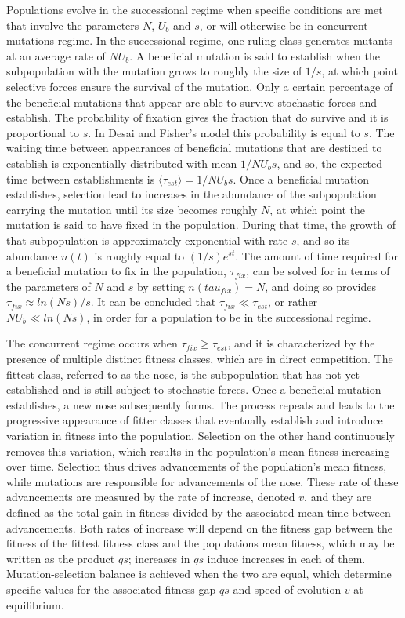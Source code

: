 \documentclass[12pt, one column]{article}
\begin{document}
Populations evolve in the successional regime when specific conditions are met that involve the parameters $N$, $U_b$ and $s$, or will otherwise be in concurrent-mutations regime.  In the successional regime, one ruling class generates mutants at an average rate of $N U_b$.  A beneficial mutation is said to establish when the subpopulation with the mutation grows to roughly the size of $1/s$, at which point selective forces ensure the survival of the mutation.  Only a certain percentage of the beneficial mutations that appear are able to survive stochastic forces and establish.  The probability of fixation gives the fraction that do survive and it is proportional to $s$.  In Desai and Fisher's model this probability is equal to $s$.  The waiting time between appearances of beneficial mutations that are destined to establish is exponentially distributed with mean $1/NU_b s$, and so, the expected time between establishments is $\langle \tau_{est} \rangle = 1/NU_b s$.  Once a beneficial mutation establishes, selection lead to increases in the abundance of the subpopulation carrying the mutation until its size becomes roughly $N$, at which point the mutation is said to have fixed in the population.  During that time, the growth of that subpopulation is approximately exponential with rate $s$, and so its abundance $n(t)$ is roughly equal to $(1/s) e^{st}$.  The amount of time required for a beneficial mutation to fix in the population, $\tau_{fix}$, can be solved for in terms of the parameters of $N$ and $s$ by setting $n(tau_{fix})=N$, and doing so provides $\tau_{fix} \approx ln(Ns)/s$.  It can be concluded that $\tau_{fix} \ll \tau_{est}$, or rather $N U_b \ll ln(Ns)$, in order for a population to be in the successional regime. 

The concurrent regime occurs when $\tau_{fix} \ge \tau_{est}$, and it is characterized by the presence of multiple distinct fitness classes, which are in direct competition.  The fittest class, referred to as the nose, is the subpopulation that has not yet established and is still subject to stochastic forces.  Once a beneficial mutation establishes, a new nose subsequently forms.  The process repeats and leads to the progressive appearance of fitter classes that eventually establish and introduce variation in fitness into the population.  Selection on the other hand continuously removes this variation, which results in the population's mean fitness increasing over time.  Selection thus drives advancements of the population's mean fitness, while mutations are responsible for advancements of the nose.  These rate of these advancements are measured by the rate of increase, denoted $v$, and they are defined as the total gain in fitness divided by the associated mean time between advancements.  Both rates of increase will depend on the fitness gap between the fitness of the fittest fitness class and the populations mean fitness, which may be written as the product $qs$; increases in $qs$ induce increases in each of them.  Mutation-selection balance is achieved when the two are equal, which determine specific values for the associated fitness gap $qs$ and speed of evolution $v$ at equilibrium. 
\end{document}
